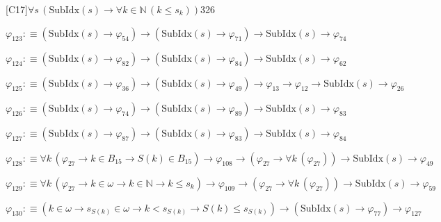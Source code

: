 \begin{fullproof}{[C17]}{$\forall s\,(\mathrm{SubIdx}(s) \to \forall k \in \mathbb{N}\,(k \leq s_{k}))$}{326}
\begin{abbrevlist}
\item $\varphi_{123} :\equiv (\mathrm{SubIdx}(s) \to \varphi_{54}) \to (\mathrm{SubIdx}(s) \to \varphi_{71}) \to \mathrm{SubIdx}(s) \to \varphi_{74}$
\item $\varphi_{124} :\equiv (\mathrm{SubIdx}(s) \to \varphi_{82}) \to (\mathrm{SubIdx}(s) \to \varphi_{84}) \to \mathrm{SubIdx}(s) \to \varphi_{62}$
\item $\varphi_{125} :\equiv (\mathrm{SubIdx}(s) \to \varphi_{36}) \to (\mathrm{SubIdx}(s) \to \varphi_{49}) \to \varphi_{13} \to \varphi_{12} \to \mathrm{SubIdx}(s) \to \varphi_{26}$
\item $\varphi_{126} :\equiv (\mathrm{SubIdx}(s) \to \varphi_{74}) \to (\mathrm{SubIdx}(s) \to \varphi_{89}) \to \mathrm{SubIdx}(s) \to \varphi_{83}$
\item $\varphi_{127} :\equiv (\mathrm{SubIdx}(s) \to \varphi_{87}) \to (\mathrm{SubIdx}(s) \to \varphi_{83}) \to \mathrm{SubIdx}(s) \to \varphi_{84}$
\item $\varphi_{128} :\equiv \forall k\,(\varphi_{27} \to k \in B_{15} \to S(k) \in B_{15}) \to \varphi_{108} \to (\varphi_{27} \to \forall k\,(\varphi_{27})) \to \mathrm{SubIdx}(s) \to \varphi_{49}$
\item $\varphi_{129} :\equiv \forall k\,(\varphi_{27} \to k \in \omega \to k \in \mathbb{N} \to k \leq s_{k}) \to \varphi_{109} \to (\varphi_{27} \to \forall k\,(\varphi_{27})) \to \mathrm{SubIdx}(s) \to \varphi_{59}$
\item $\varphi_{130} :\equiv (k \in \omega \to s_{S(k)} \in \omega \to k < s_{S(k)} \to S(k) \leq s_{S(k)}) \to (\mathrm{SubIdx}(s) \to \varphi_{77}) \to \varphi_{127}$
\end{abbrevlist}
\end{fullproof}
